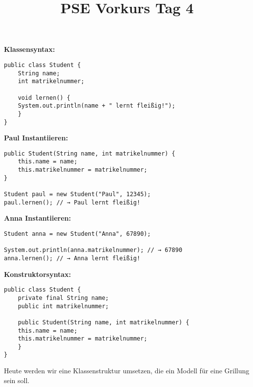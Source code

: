 \documentclass{../../sheet}
\title{PSE Vorkurs Tag 4}
\begin{document}
\maketitle

\textbf{Klassensyntax:}
	\begin{verbatim}
public class Student {
    String name;
    int matrikelnummer;

    void lernen() {
	System.out.println(name + " lernt fleißig!");
    }
}
\end{verbatim}

\textbf{Paul Instantiieren:}
	
	\begin{verbatim}
public Student(String name, int matrikelnummer) {
    this.name = name;
    this.matrikelnummer = matrikelnummer;
}

Student paul = new Student("Paul", 12345);
paul.lernen(); // → Paul lernt fleißig!
	\end{verbatim}
	
\textbf{Anna Instantiieren:}

	\begin{verbatim}
Student anna = new Student("Anna", 67890);

System.out.println(anna.matrikelnummer); // → 67890
anna.lernen(); // → Anna lernt fleißig!
	\end{verbatim}

\textbf{Konstruktorsyntax:}

	\begin{verbatim}
public class Student {
    private final String name;
    public int matrikelnummer;

    public Student(String name, int matrikelnummer) {
	this.name = name;
	this.matrikelnummer = matrikelnummer;
    }
}
	\end{verbatim}

\newpage

Heute werden wir eine Klassenstruktur umsetzen, die ein Modell für eine Grillung sein soll.
\end{document}
